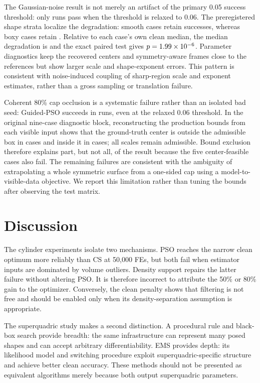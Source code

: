\documentclass[conference]{IEEEtran}
\begin{document}
The Gaussian-noise result is not merely an artifact of the primary 0.05
success threshold: only \SQNoisePSOSuccessAtSix{} runs pass when the threshold
is relaxed to 0.06.  The preregistered shape strata localize the degradation:
smooth cases retain \SQNoiseSmoothSuccess{} successes, whereas boxy cases retain
\SQNoiseBoxySuccess{}.  Relative to each case's own clean median, the median
degradation is \SQNoiseRelativeDegradation{} and the exact paired test gives
$p=1.99\times10^{-6}$.  Parameter diagnostics keep the recovered centers and
symmetry-aware frames close to the references but show larger scale and
shape-exponent errors.  This pattern is consistent with noise-induced coupling
of sharp-region scale and exponent estimates, rather than a gross sampling or
translation failure.

Coherent 80\% cap occlusion is a systematic failure rather than an isolated
bad seed: Guided-PSO succeeds in \SQOcclusionPSOSuccess{} runs, even at the
relaxed 0.06 threshold.  In the original nine-case diagnostic block,
reconstructing the production bounds from each visible input shows that the
ground-truth center is outside the admissible box in
\SQOcclusionCenterInfeasible{} cases and inside it in
\SQOcclusionCenterFeasible{} cases; all scales remain admissible.  Bound
exclusion therefore explains part, but not all, of the result because the five
center-feasible cases also fail.  The remaining failures are consistent with
the ambiguity of extrapolating a whole symmetric surface from a one-sided cap
using a model-to-visible-data objective.  We report this limitation rather than
tuning the bounds after observing the test matrix.

\fi

\FloatBarrier
\section{Discussion}
The cylinder experiments isolate two mechanisms.  PSO reaches the narrow clean
optimum more reliably than CS at 50,000 FEs, but both fail when estimator inputs
are dominated by volume outliers.  Density support repairs the latter failure
without altering PSO.  It is therefore incorrect to attribute the 50\% or 80\%
gain to the optimizer.  Conversely, the clean penalty shows that filtering is
not free and should be enabled only when its density-separation assumption is
appropriate.

The superquadric study makes a second distinction.  A procedural rule and
black-box search provide breadth: the same infrastructure can represent many
posed shapes and can accept arbitrary differentiability.  EMS provides depth:
its likelihood model and switching procedure exploit superquadric-specific
structure and achieve better clean accuracy.  These methods should not be
presented as equivalent algorithms merely because both output superquadric
parameters.
\end{document}
